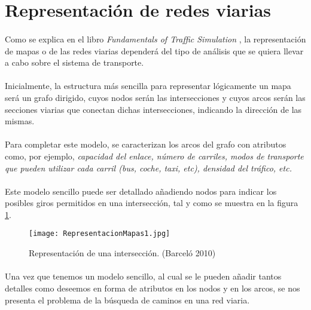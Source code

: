 \newpage

\section{Representación de redes viarias}

	\paragraph{}
	Como se explica en el libro \emph{Fundamentals of Traffic Simulation} \cite{Barcelo2010}, la representación de mapas o de las redes viarias dependerá del tipo de análisis que se quiera llevar a cabo sobre el sistema de transporte.
	
	\paragraph{}
	Inicialmente, la estructura más sencilla para representar lógicamente un mapa será un grafo dirigido, cuyos nodos serán las intersecciones y cuyos arcos serán las secciones viarias que conectan dichas intersecciones, indicando la dirección de las mismas.
	
	\paragraph{}
	Para completar este modelo, se caracterizan los arcos del grafo con atributos como, por ejemplo,  \emph{capacidad del enlace, número de carriles, modos de transporte que pueden utilizar cada carril (bus, coche, taxi, etc), densidad del tráfico, etc.}
	
	\paragraph{}
	Este modelo sencillo puede ser detallado añadiendo nodos para indicar los posibles giros permitidos en una intersección, tal y como se muestra en la figura \ref{fig:RepresentacionMapas1}.
	
	\begin{figure}[ht]
		\centering
			\texttt{[image: RepresentacionMapas1.jpg]}
		\caption{Representación de una intersección. (Barceló 2010) \cite{Barcelo2010}}
		\label{fig:RepresentacionMapas1}
	\end{figure}	

	\paragraph{}
	Una vez que tenemos un modelo sencillo, al cual se le pueden añadir tantos detalles como deseemos en forma de atributos en los nodos y en los arcos, se nos presenta el problema de la búsqueda de caminos en una red viaria.
	
